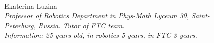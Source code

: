 \begin{figure}[H]
\begin{minipage}[h]{0.47\linewidth}
		\\
	\end{minipage}
	\hfill
	\begin{minipage}{0.47\linewidth}
		Ekaterina Luzina \\
		\emph{Professor of Robotics Department in Phys-Math Lyceum 30, Saint-Peterburg, Russia. Tutor of FTC team. \\}
		\emph{Information: 25 years old, in robotics 5 years, in FTC 3 years.}
	\end{minipage}
\end{figure}

